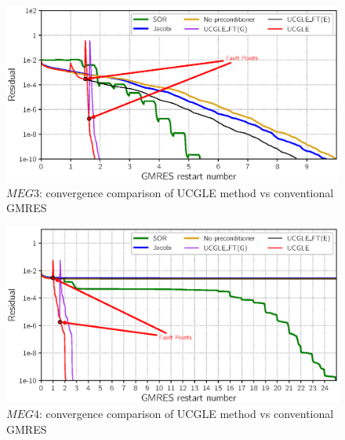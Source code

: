 \begin{figure}[htbp]
	\centering
	\includegraphics[width=6.2in]{fig/convergence3.eps}
	\caption{$MEG3$: convergence comparison of UCGLE method vs conventional GMRES}
	\label{fig:conv3}
\end{figure}

\begin{figure}[htbp]
	\centering
	\includegraphics[width=6.2in]{fig/convergence4.eps}
	\caption{$MEG4$: convergence comparison of UCGLE method vs conventional GMRES}
	\label{fig:conv4}
\end{figure}

